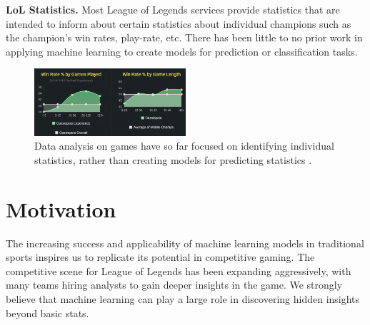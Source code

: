 \textbf{LoL Statistics. }
Most League of Legends services provide statistics that are intended to inform about certain statistics about individual champions such as the champion's win rates, play-rate, etc.  There has been little to no prior work in applying machine learning to create models for prediction or classification tasks.

\begin{figure}[t!]
  \centering
    \includegraphics[width=0.5\textwidth]{basic-statistics}
  \caption{Data analysis on games have so far focused on identifying individual statistics, rather than creating models for predicting statistics \cite{6_championgg_2015}. }
  \label{fig:basic-stats}
\end{figure}


\section{Motivation}
The increasing success and applicability of machine learning models in traditional 
sports inspires us to replicate its potential in competitive gaming.  
The competitive scene for League of Legends has been expanding aggressively, 
with many teams hiring analysts to gain deeper insights in the game.  We strongly 
believe that machine learning can play a large role in discovering hidden insights beyond basic stats.  